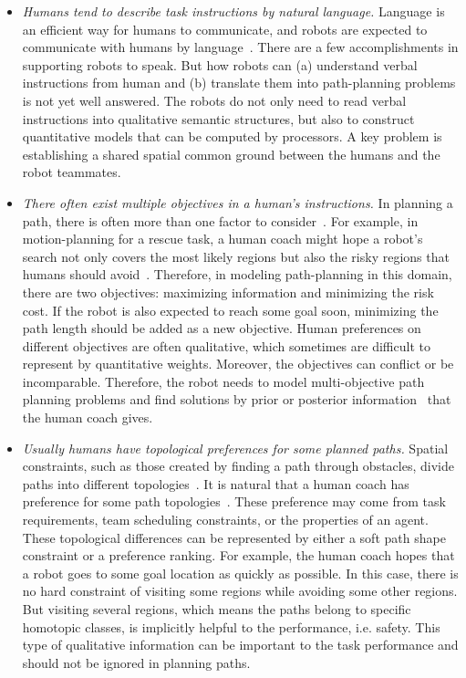 \documentclass[phd]{byuprop}
\begin{document}
\begin{itemize}

\item {\em Humans tend to describe task instructions by natural language.}
Language is an efficient way for humans to communicate, and robots are expected to communicate with humans by language~\cite{Kollar:2010:TUN:1734454.1734553,howard2014natural}. 
There are a few accomplishments in supporting robots to speak.
But how robots can (a) understand verbal instructions from human and (b) translate them into path-planning problems is not yet well answered. 
The robots do not only need to read verbal instructions into qualitative semantic structures, but also to construct quantitative models that can be computed by processors.
A key problem is establishing a shared spatial common ground between the humans and the robot teammates.

\item {\em There often exist multiple objectives in a human's instructions.}
In planning a path, there is often more than one factor to consider~\cite{Ahmed2013}.
For example, in motion-planning for a rescue task, a human coach might hope a robot's search not only covers the most likely regions but also the risky regions that humans should avoid~\cite{Yi2014}.
Therefore, in modeling path-planning in this domain, there are two objectives: maximizing information and minimizing the risk cost.
If the robot is also expected to reach some goal soon, minimizing the path length should be added as a new objective.
Human preferences on different objectives are often qualitative, which sometimes are difficult to represent by quantitative weights.
Moreover, the objectives can conflict or be incomparable.
Therefore, the robot needs to model multi-objective path planning problems and find solutions by prior or posterior information~\cite{Miettinen1999} that the human coach gives.

\item {\em Usually humans have topological preferences for some planned paths.}
Spatial constraints, such as those created by finding a path through obstacles, divide paths into different topologies~\cite{Bhattachary2010}.
It is natural that a human coach has preference for some path topologies~\cite{Yi2014}.
These preference may come from task requirements, team scheduling constraints, or the properties of an agent.
These topological differences can be represented by either a soft path shape constraint or a preference ranking.
For example, the human coach hopes that a robot goes to some goal location as quickly as possible.
In this case, there is no hard constraint of visiting some regions while avoiding some other regions.
But visiting several regions, which means the paths belong to specific homotopic classes, is implicitly helpful to the performance, i.e. safety.
This type of qualitative information can be important to the task performance and should not be ignored in planning paths.

\end{itemize} 
\end{document}
